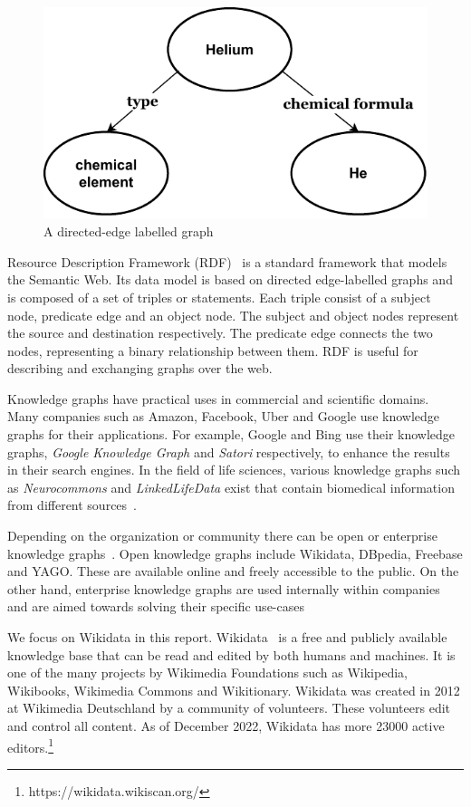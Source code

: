 \begin{figure}[h]
  \centering
  \includegraphics[width=0.75 \linewidth]{images/knowledge_graph.drawio.pdf}
  \caption{A directed-edge labelled graph}
  \label{fig:1}
\end{figure}
Resource Description Framework (RDF)~\cite{R.Cyganiak2014} is a standard framework that models the Semantic Web. Its data model is based on directed edge-labelled graphs and is composed of a set of triples or statements. Each triple consist of a subject node, predicate edge and an object node. The subject and object nodes represent the source and destination respectively. The predicate edge connects the two nodes, representing a binary relationship between them. RDF is useful for describing and exchanging graphs over the web. 

Knowledge graphs have practical uses in commercial and scientific domains. Many companies such as Amazon, Facebook, Uber and Google use knowledge graphs for their applications. For example, Google and Bing use their knowledge graphs, \textit{Google Knowledge Graph} and \textit{Satori} respectively, to enhance the results in their search engines. In the field of life sciences, various knowledge graphs such as \textit{Neurocommons} and \textit{LinkedLifeData} exist that contain biomedical information from different sources~\cite{Nickel2015}. 

Depending on the organization or community there can be open or enterprise knowledge graphs~\cite{Hogan2021}. Open knowledge graphs include Wikidata, DBpedia, Freebase and YAGO. These are available online and freely accessible to the public. On the other hand, enterprise knowledge graphs are used internally within companies and are aimed towards solving their specific use-cases

We focus on Wikidata in this report. Wikidata~\cite{Foundationa} is a free and publicly available knowledge base that can be read and edited by both humans and machines. It is one of the many projects by Wikimedia Foundations such as Wikipedia, Wikibooks, Wikimedia Commons and Wikitionary. Wikidata was created in 2012 at Wikimedia Deutschland by a community of volunteers. These volunteers edit and control all content. As of December 2022, Wikidata has more 23000 active editors.\footnote{https://wikidata.wikiscan.org/}

